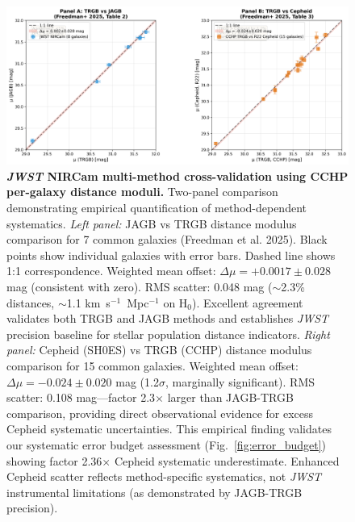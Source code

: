 \documentclass[twocolumn, linenumbers]{aastex701}
\begin{document}
\begin{figure}
\includegraphics[width=\textwidth]{../figures/figure3_cchp_crossval_real.png}
\caption{\textbf{\textit{JWST} NIRCam multi-method cross-validation using CCHP per-galaxy distance moduli.} Two-panel comparison demonstrating empirical quantification of method-dependent systematics. \textit{Left panel:} JAGB vs TRGB distance modulus comparison for 7 common galaxies (Freedman et al. 2025). Black points show individual galaxies with error bars. Dashed line shows 1:1 correspondence. Weighted mean offset: $\Delta\mu = +0.0017 \pm 0.028$ mag (consistent with zero). RMS scatter: 0.048 mag ($\sim$2.3\% distances, $\sim$1.1 km~s$^{-1}$~Mpc$^{-1}$ on H$_0$). Excellent agreement validates both TRGB and JAGB methods and establishes \textit{JWST} precision baseline for stellar population distance indicators. \textit{Right panel:} Cepheid (SH0ES) vs TRGB (CCHP) distance modulus comparison for 15 common galaxies. Weighted mean offset: $\Delta\mu = -0.024 \pm 0.020$ mag (1.2$\sigma$, marginally significant). RMS scatter: 0.108 mag---factor 2.3$\times$ larger than JAGB-TRGB comparison, providing direct observational evidence for excess Cepheid systematic uncertainties. This empirical finding validates our systematic error budget assessment (Fig.~\ref{fig:error_budget}) showing factor 2.36$\times$ Cepheid systematic underestimate. Enhanced Cepheid scatter reflects method-specific systematics, not \textit{JWST} instrumental limitations (as demonstrated by JAGB-TRGB precision).}
\label{fig:cchp_crossval}
\end{figure}
\end{document}

